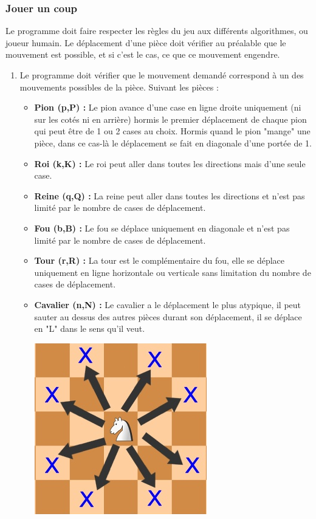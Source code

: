 \huge\documentclass{article}
\begin{document}
    \subsubsection{Jouer un coup}
    Le programme doit faire respecter les règles du jeu aux différents algorithmes, ou joueur humain.
    Le déplacement d'une pièce doit vérifier au préalable que le mouvement est possible, et si c'est le cas, ce que ce mouvement engendre.
    \begin{enumerate}
        \item Le programme doit vérifier que le mouvement demandé correspond à un des mouvements possibles de la pièce.
        Suivant les pièces :
        \begin{itemize}
            \item \textbf{Pion (p,P) : } Le pion avance d'une case en ligne droite uniquement (ni sur les cotés ni en arrière) hormis le premier déplacement de chaque pion qui peut être de 1 ou 2 cases au choix.
            Hormis quand le pion "mange" une pièce, dans ce cas-là le déplacement se fait en diagonale d'une portée de 1.
            \item \textbf{Roi (k,K) : } Le roi peut aller dans toutes les directions mais d'une seule case.
            \item \textbf{Reine (q,Q) : } La reine peut aller dans toutes les directions et n'est pas limité par le nombre de cases de déplacement.
            \item \textbf{Fou (b,B) : } Le fou se déplace uniquement en diagonale et n'est pas limité par le nombre de cases de déplacement.
            \item \textbf{Tour (r,R) : } La tour est le complémentaire du fou, elle se déplace uniquement en ligne horizontale ou verticale sans limitation du nombre de cases de déplacement.
            \item \textbf{Cavalier (n,N) : } Le cavalier a le déplacement le plus atypique, il peut sauter au dessus des autres pièces durant son déplacement, il se déplace en "L" dans le sens qu'il veut.
            \newline
            \centerline{\includegraphics[scale = 0.2]{img/Deplacement_cavalier.png}}

\end{itemize}
\end{enumerate}
\end{document}
